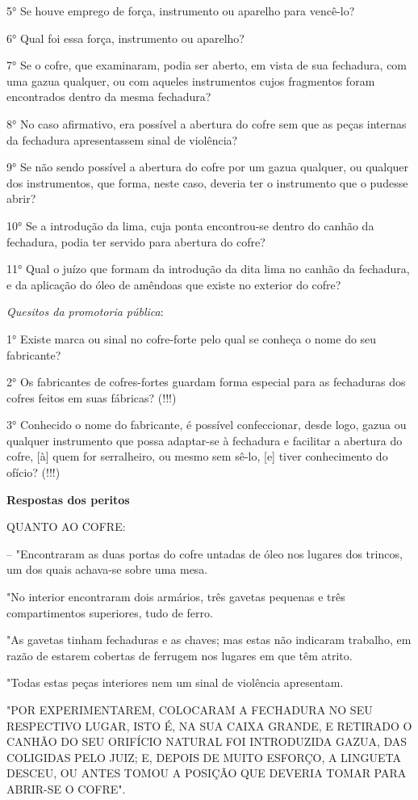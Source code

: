 5° Se houve emprego de força, instrumento ou aparelho para vencê-lo?

6° Qual foi essa força, instrumento ou aparelho?

7° Se o cofre, que examinaram, podia ser aberto, em vista de sua
fechadura, com uma gazua qualquer, ou com aqueles instrumentos cujos
fragmentos foram encontrados dentro da mesma fechadura?

8° No caso afirmativo, era possível a abertura do cofre sem que as peças
internas da fechadura apresentassem sinal de violência?

9° Se não sendo possível a abertura do cofre por um gazua qualquer, ou
qualquer dos instrumentos, que forma, neste caso, deveria ter o
instrumento que o pudesse abrir?

10° Se a introdução da lima, cuja ponta encontrou-se dentro do canhão da
fechadura, podia ter servido para abertura do cofre?

11° Qual o juízo que formam da introdução da dita lima no canhão da
fechadura, e da aplicação do óleo de amêndoas que existe no exterior do
cofre?

\emph{Quesitos da promotoria pública}:

1° Existe marca ou sinal no cofre-forte pelo qual se conheça o nome do
seu fabricante?

2° Os fabricantes de cofres-fortes guardam forma especial para as
fechaduras dos cofres feitos em suas fábricas? (!!!)

3° Conhecido o nome do fabricante, é possível confeccionar, desde logo,
gazua ou qualquer instrumento que possa adaptar-se à fechadura e
facilitar a abertura do cofre, {[}à{]} quem for serralheiro, ou mesmo
sem sê-lo, {[}e{]} tiver conhecimento do ofício? (!!!)

\textbf{Respostas dos peritos}

QUANTO AO COFRE:

-- "Encontraram as duas portas do cofre untadas de óleo nos lugares dos
trincos, um dos quais achava-se sobre uma mesa.

"No interior encontraram dois armários, três gavetas pequenas e três
compartimentos superiores, tudo de ferro.

"As gavetas tinham fechaduras e as chaves; mas estas não indicaram
trabalho, em razão de estarem cobertas de ferrugem nos lugares em que
têm atrito.

"Todas estas peças interiores nem um sinal de violência apresentam.

"POR EXPERIMENTAREM, COLOCARAM A FECHADURA NO SEU RESPECTIVO LUGAR, ISTO
É, NA SUA CAIXA GRANDE, E RETIRADO O CANHÃO DO SEU ORIFÍCIO NATURAL FOI
INTRODUZIDA GAZUA, DAS COLIGIDAS PELO JUIZ; E, DEPOIS DE MUITO ESFORÇO,
A LINGUETA DESCEU, OU ANTES TOMOU A POSIÇÃO QUE DEVERIA TOMAR PARA
ABRIR-SE O COFRE".

